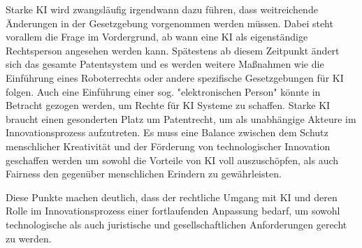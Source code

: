 Starke KI wird zwangsläufig irgendwann dazu 
führen, dass weitreichende Änderungen in der 
Gesetzgebung vorgenommen werden müssen. Dabei steht 
vorallem die Frage im Vordergrund, ab wann eine 
KI als eigenständige Rechtsperson angesehen werden
kann. Spätestens ab diesem Zeitpunkt ändert sich 
das gesamte Patentsystem und es werden weitere 
Maßnahmen wie die Einführung eines Roboterrechts oder
andere spezifische Gesetzgebungen für KI folgen. 
Auch eine Einführung einer sog. "elektronischen
Person" könnte in Betracht gezogen werden, um
Rechte für KI Systeme zu schaffen.
Starke KI braucht einen gesonderten Platz um 
Patentrecht, um als unabhängige Akteure 
im Innovationsprozess aufzutreten.
Es muss eine Balance zwischen dem Schutz menschlicher Kreativität 
und der Förderung von technologischer Innovation geschaffen werden
um sowohl die Vorteile von KI voll auszuschöpfen, als 
auch Fairness den gegenüber menschlichen Erindern zu 
gewährleisten.

Diese Punkte machen deutlich, 
dass der rechtliche Umgang mit KI und deren Rolle 
im Innovationsprozess einer fortlaufenden Anpassung bedarf, 
um sowohl technologische 
als auch juristische und gesellschaftlichen
Anforderungen gerecht zu werden.
